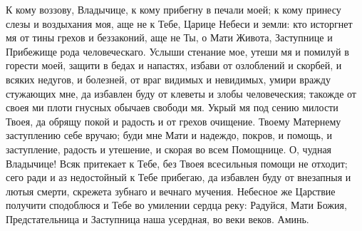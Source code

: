 К кому воззову, Владычице, к кому прибегну в печали моей; к кому принесу слезы и воздыхания моя, аще не к Тебе, Царице Небеси и земли: кто исторгнет мя от тины грехов и беззаконий, аще не Ты, о Мати Живота, Заступнице и Прибежище рода человеческаго. Услыши стенание мое, утеши мя и помилуй в горести моей, защити в бедах и напастях, избави от озлоблений и скорбей, и всяких недугов, и болезней, от враг видимых и невидимых, умири вражду стужающих мне, да избавлен буду от клеветы и злобы человеческия; такожде от своея ми плоти гнусных обычаев свободи мя. Укрый мя под сению милости Твоея, да обрящу покой и радость и от грехов очищение. Твоему Матернему заступлению себе вручаю; буди мне Мати и надеждо, покров, и помощь, и заступление, радость и утешение, и скорая во всем Помощнице. О, чудная Владычице! Всяк притекает к Тебе, без Твоея всесильныя помощи не отходит; сего ради и аз недостойный к Тебе прибегаю, да избавлен буду от внезапныя и лютыя смерти, скрежета зубнаго и вечнаго мучения. Небесное же Царствие получити сподоблюся и Тебе во умилении сердца реку: Радуйся, Мати Божия, Предстательница и Заступница наша усердная, во веки веков. Аминь.
\mychapterending

 


